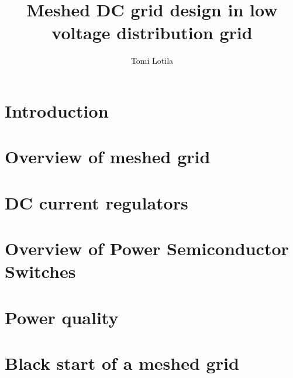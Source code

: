 \documentclass{report}
\begin{document}
\title{Meshed DC grid design in low voltage distribution grid}
\author{Tomi Lotila}
\maketitle

\tableofcontents

\chapter{Introduction}


\chapter{Overview of meshed grid}


\chapter{DC current regulators}


\chapter{Overview of Power Semiconductor Switches}


\chapter{Power quality}


\chapter{Black start of a meshed grid}

\end{document}
